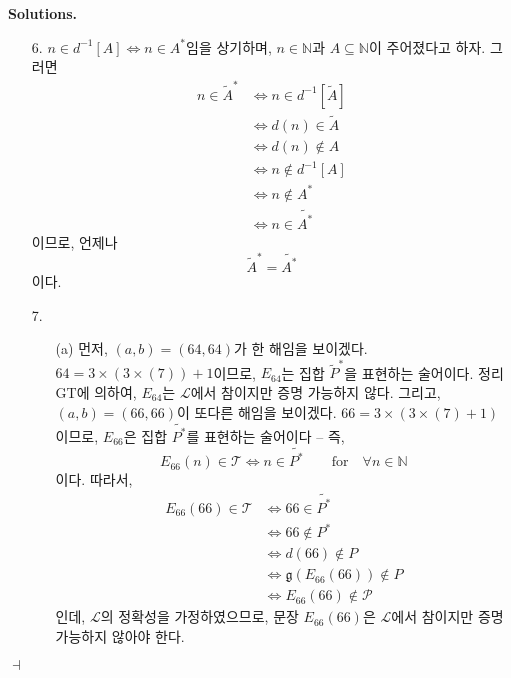 \documentclass[12pt]{paper}
\newcommand{\gnum}
{ \mathfrak{g} }
\newenvironment{context}[1][]
{ \noindent \textbf{{#1}.} }
{ \hfill $ \dashv $ }
\begin{document}
\begin{context}[Solutions]
\begin{enumerate}
\item[{6.}] $n \in d^{-1} \left[ A \right] \iff n \in A^{*} $임을 상기하며,
$n \in \mathbb{N}$과 $A \subseteq \mathbb{N}$이 주어졌다고 하자. 그러면
\begin{align*}
n \in \widetilde{A}^{*}
& \iff n \in d^{-1} \left[ \widetilde{A} \right] \\
& \iff d \left( n \right) \in \widetilde{A} \\
& \iff d \left( n \right) \notin A \\
& \iff n \notin d^{-1} \left[ A \right] \\
& \iff n \notin A^{*} \\
& \iff n \in \widetilde{A^{*}}
\end{align*}
이므로, 언제나 $$\widetilde{A}^{*} = \widetilde{A^{*}}$$이다.

\item[{7.}]
\begin{itemize}
\item[(a)] 먼저, $\left( a , b \right) = \left( 64 , 64 \right)$가 한 해임을 보이겠다. 
$64 = 3 \times \left( 3 \times \left( 7 \right) \right) + 1$이므로,
$E_{64}$는 집합 $\widetilde{P}^{*}$을 표현하는 술어이다.
정리 GT에 의하여, $E_{64}$는 $\mathcal{L}$에서 참이지만 증명 가능하지 않다.
그리고, $\left( a , b \right) = \left( 66 , 66 \right)$이 또다른 해임을 보이겠다.
$66 = 3 \times \left( 3 \times \left( 7 \right) + 1 \right)$이므로,
$E_{66}$은 집합 $\widetilde{P^{*}}$를 표현하는 술어이다 --
즉, $$ E_{66} \left( n \right) \in \mathcal{T} \iff n \in \widetilde{P^{*}} \qquad \mathrm{for} \quad \forall n \in \mathbb{N} $$이다.
따라서,
\begin{align*}
E_{66} \left( 66 \right) \in \mathcal{T}
& \iff 66 \in \widetilde{P^{*}} \\
& \iff 66 \notin P^{*} \\
& \iff d \left( 66 \right) \notin P \\
& \iff \gnum \left( E_{66} \left( 66 \right) \right) \notin P \\
& \iff E_{66} \left( 66 \right) \notin \mathcal{P}
\end{align*}
인데, $\mathcal{L}$의 정확성을 가정하였으므로,
문장 $E_{66} \left( 66 \right)$은 $\mathcal{L}$에서 참이지만 증명 가능하지 않아야 한다.


\end{itemize}
\end{enumerate}
\end{context}
\end{document}
